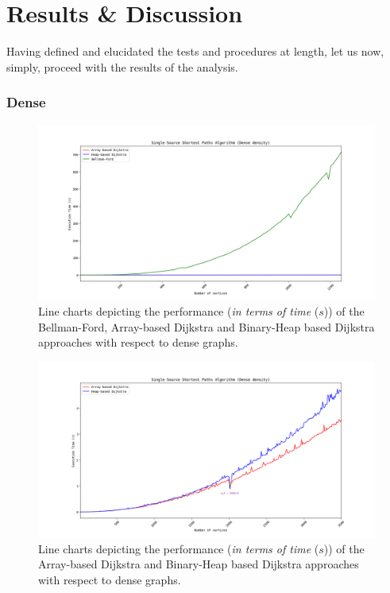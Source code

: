 \documentclass[a4paper, 12pt]{report}
\theoremstyle{definition}
\begin{document}
\section{Results \& Discussion}
Having defined and elucidated the tests and procedures at length, let us now, simply, proceed with the results of the analysis.

\subsubsection{Dense}

\begin{figure}[H]
  \centering
  \includegraphics[width=5.5in]{all_dense_01.png}
  \caption{Line charts depicting the performance (\emph{in terms of time} (\(s\))) of the Bellman-Ford, Array-based Dijkstra and Binary-Heap based Dijkstra approaches with respect to dense graphs.}
  \label{fig6:dense1}
\end{figure}

\begin{figure}[H]
  \centering
  \includegraphics[width=5.5in]{all_dense_02.png}
  \caption{Line charts depicting the performance (\emph{in terms of time} (\(s\))) of the Array-based Dijkstra and Binary-Heap based Dijkstra approaches with respect to dense graphs.}
  \label{fig7:dense2}
\end{figure}
\end{document}
